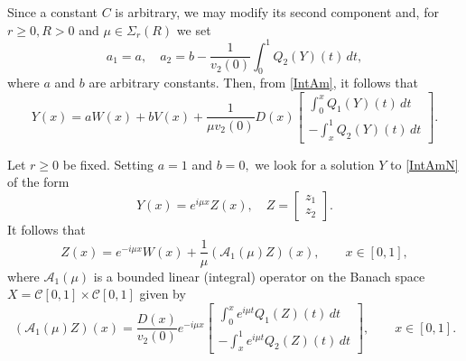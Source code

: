 \documentclass[11pt]{amsart}
\theoremstyle{plain}
\theoremstyle{definition}
\theoremstyle{remark}
\numberwithin{equation}{section}
\begin{document}
Since a constant $C$ is arbitrary,  we may modify its second component
and, for $r \ge 0, R>0$ and $\mu \in \Sigma_r(R)$ we set
\[
a_1=a,\quad a_2=b-\frac{1}{v_2(0)}\int_0^1 Q_2(Y)(t)\,dt,
\]
where $a$ and $b$ are arbitrary constants.
Then, from \eqref{IntAm}, it follows that
\begin{equation}\label{IntAmN}
Y(x)=aW(x)+bV(x)
+\frac{1}{\mu v_2(0)}
D(x)\left[
\begin{array}{c}\int_0^x Q_1(Y)(t)\,dt\\
-\int_x^1 Q_2(Y)(t)\,dt
\end{array}\right].
\end{equation}

Let $r \geq 0$ be fixed.
Setting
$a=1$ and $b=0,$ we look for a solution $Y$ to \eqref{IntAmN} of the form
\[
Y(x)=e^{i\mu x}Z(x),\quad Z=\left[\begin{array}{c}
z_1\\ z_2
\end{array}\right].
\]
It follows that
\begin{equation}\label{OA1}
Z(x)= e^{-i\mu x}W(x)
+\frac{1}{\mu}
(\mathcal{A}_1(\mu)Z)(x),\qquad x\in [0,1],
\end{equation}
where $\mathcal{A}_1(\mu)$ is a bounded linear (integral) operator on the Banach
space $X=\mathcal C[0,1]\times \mathcal C[0,1]$
given by
\[
(\mathcal{A}_1(\mu) Z)(x)=
\frac{D(x)}{v_2(0)}e^{-i\mu x}
\left[\begin{array}{c}
\int_0^x e^{i\mu t} Q_1(Z)(t)\,dt\\
-\int_x^1 e^{i\mu t} Q_2(Z)(t)\,dt
\end{array}\right], \qquad x \in [0,1].
\]
\end{document}
